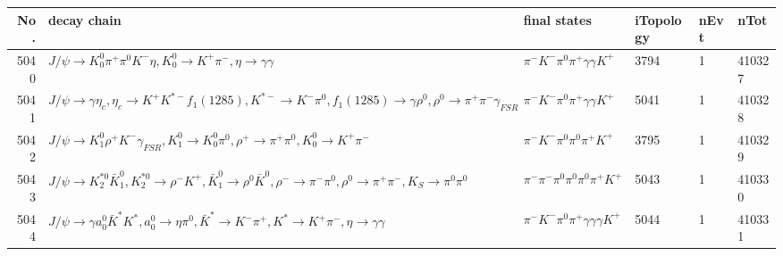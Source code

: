 \begin{table}[htbp] 
\begin{center}
\begin{small}
\begin{tabular}{rlllll}\hline\hline
 No. & decay chain & final states &  iTopology & nEvt & nTot \\\hline
5040&$J/\psi       \rightarrow K_0^{0}        \pi^{+}        \pi^{0}        K^{-}          \eta          , K_0^{0}         \rightarrow K^{+}          \pi^{-}        , \eta           \rightarrow \gamma       \gamma       $&$\pi^{-}        K^{-}          \pi^{0}        \pi^{+}        \gamma       \gamma       K^{+}          $& 3794&    1&410327\\
5041&$J/\psi       \rightarrow \gamma       \eta_{c}    , \eta_{c}     \rightarrow K^{+}          K^{*-}         f_{1}(1285)    , K^{*-}          \rightarrow K^{-}          \pi^{0}        , f_{1}(1285)     \rightarrow \gamma       \rho^{0}      , \rho^{0}       \rightarrow \pi^{+}        \pi^{-}        \gamma_{FSR} $&$\pi^{-}        K^{-}          \pi^{0}        \pi^{+}        \gamma       \gamma       K^{+}          $& 5041&    1&410328\\
5042&$J/\psi       \rightarrow K_1^{0}        \rho^{+}      K^{-}          \gamma_{FSR} , K_1^{0}         \rightarrow K_0^{0}        \pi^{0}        , \rho^{+}       \rightarrow \pi^{+}        \pi^{0}        , K_0^{0}         \rightarrow K^{+}          \pi^{-}        $&$\pi^{-}        K^{-}          \pi^{0}        \pi^{0}        \pi^{+}        K^{+}          $& 3795&    1&410329\\
5043&$J/\psi       \rightarrow K_2^{*0}       \bar{K}_1^{0} , K_2^{*0}        \rightarrow \rho^{-}      K^{+}          , \bar{K}_1^{0}  \rightarrow \rho^{0}      \bar{K}^{0}   , \rho^{-}       \rightarrow \pi^{-}        \pi^{0}        , \rho^{0}       \rightarrow \pi^{+}        \pi^{-}        , K_{S}           \rightarrow \pi^{0}        \pi^{0}        $&$\pi^{-}        \pi^{-}        \pi^{0}        \pi^{0}        \pi^{0}        \pi^{+}        K^{+}          $& 5043&    1&410330\\
5044&$J/\psi       \rightarrow \gamma       a_{0}^{0}      \bar{K}^{*}   K^{*}          , a_{0}^{0}       \rightarrow \eta          \pi^{0}        , \bar{K}^{*}    \rightarrow K^{-}          \pi^{+}        , K^{*}           \rightarrow K^{+}          \pi^{-}        , \eta           \rightarrow \gamma       \gamma       $&$\pi^{-}        K^{-}          \pi^{0}        \pi^{+}        \gamma       \gamma       \gamma       K^{+}          $& 5044&    1&410331\\

\end{tabular}
\end{small}
\end{center}
\end{table}
